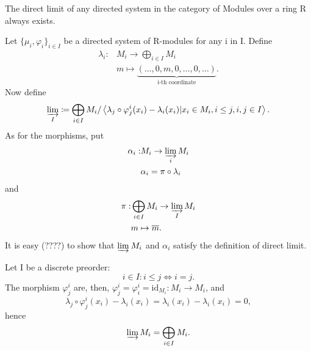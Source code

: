 \documentclass[../category_theory.tex]{subfiles}
\begin{document}
\begin{theorem*}
	The direct limit of any directed system in the category of Modules over a ring R always exists.
\end{theorem*}
\begin{proof*}
	Let \(\{\mu_{i}, \varphi_{i}\}_{i\in I}\) be a directed system of R-modules for any i in I. Define
	\begin{align*}
		\lambda_{i}: & M_{i}\rightarrow \bigoplus_{i\in I}M_{i}                                                \\
		             & m\mapsto \underbrace{(\dotsc , 0, m, 0, \dotsc , 0, \dotsc )}_{\text{i-th coordinate}}.
	\end{align*}
	Now define
	\[
		\varinjlim_{I}\coloneqq \bigoplus_{i\in I}M_{i}/ \left< \lambda_{j}\circ \varphi_{j}^{i}(x_{i})-\lambda_{i}(x_{i})|x_{i}\in M_{i}, i\leq j, i, j\in I  \right>.
	\]
	As for the morphisms, put
	\begin{align*}
		\alpha_{i}: & M_{i}\rightarrow \varinjlim_{i}M_{i} \\
		            & \alpha_{i}=\pi\circ \lambda_{i}
	\end{align*}
	and
	\begin{align*}
		\pi : & \bigoplus_{i\in I}M_{i}\rightarrow \varinjlim_{I}M_{i} \\
		      & m\mapsto \overline{m}.
	\end{align*}
	It is easy (????) to show that \(\varinjlim_{}M_{i}\) and \(\alpha_{i}\) satisfy the definition of direct limit. \qedsymbol
\end{proof*}
\begin{example}
	Let I be a discrete preorder:
	\[
		i\in I: i\leq j \Longleftrightarrow  i=j.
	\]
	The morphism \(\varphi_{j}^{i}\) are, then, \(\varphi_{j}^{i}=\varphi_{i}^{i}=\mathrm{id}_{M_{i}}:M_{i}\rightarrow M_{i}\), and
	\[
		\lambda_{j}\circ \varphi_{j}^{i}(x_{i})-\lambda_{i}(x_{i})=\lambda_{i}(x_{i})-\lambda_{i}(x_{i})=0,
	\]
	hence
	\[
		\varinjlim_{}M_{i}=\bigoplus_{i\in I}M_{i}.
	\]
\end{example}
\end{document}

